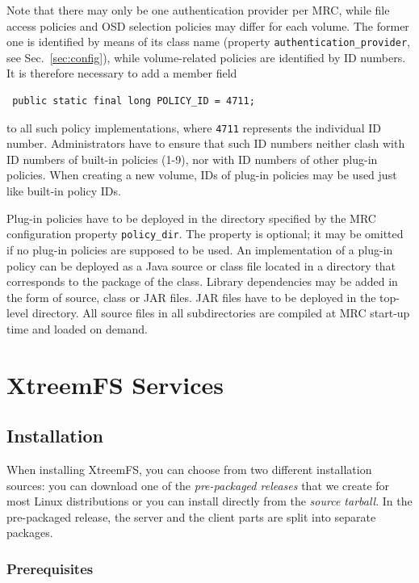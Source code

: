 \documentclass[a4paper,10pt]{book}
\begin{document}
Note that there may only be one authentication provider per MRC, while file access policies and OSD selection policies may differ for each volume. The former one is identified by means of its class name (property \texttt{authentication\_provider}, see Sec.\ \ref{sec:config}), while volume-related policies are identified by ID numbers. It is therefore necessary to add a member field

\begin{verbatim}
 public static final long POLICY_ID = 4711;
\end{verbatim}

to all such policy implementations, where \texttt{4711} represents the individual ID number. Administrators have to ensure that such ID numbers neither clash with ID numbers of built-in policies (1-9), nor with ID numbers of other plug-in policies. When creating a new volume, IDs of plug-in policies may be used just like built-in policy IDs.

Plug-in policies have to be deployed in the directory specified by the MRC configuration property \texttt{policy\_dir}. The property is optional; it may be omitted if no plug-in policies are supposed to be used. An implementation of a plug-in policy can be deployed as a Java source or class file located in a directory that corresponds to the package of the class. Library dependencies may be added in the form of source, class or JAR files. JAR files have to be deployed in the top-level directory. All source files in all subdirectories are compiled at MRC start-up time and loaded on demand.


\chapter{XtreemFS Services}

\section{Installation}

When installing XtreemFS, you can choose from two different installation sources: you can download one of the \emph{pre-packaged releases} that we create for most Linux distributions or you can install directly from the \emph{source tarball}. In the pre-packaged release, the server and the client parts are split into separate packages.

\subsection{Prerequisites}
\end{document}

